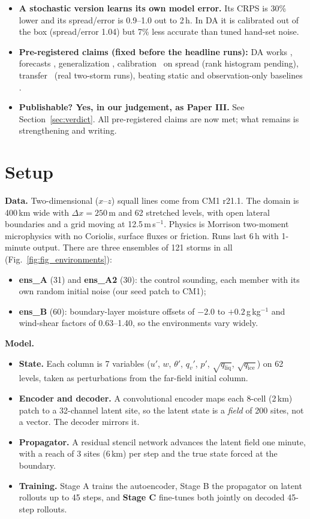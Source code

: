 \documentclass[11pt]{article}
\begin{document}
\begin{tcolorbox}[colback=blue!3,colframe=blue!40!black,title=Headline results (all on storms the model never saw)]
\begin{itemize}
\item \textbf{A stochastic version learns its own model error.} Its CRPS is 30\% lower and its spread/error is 0.9--1.0 out to 2\,h. In DA it is calibrated out of the box (spread/error 1.04) but 7\% less accurate than tuned hand-set noise.
\item \textbf{Pre-registered claims (fixed before the headline runs):} DA works \checkmark, forecasts \checkmark, generalization \checkmark, calibration \checkmark\ on spread (rank histogram pending), transfer \checkmark\ (real two-storm runs), beating static and observation-only baselines \checkmark.
\item \textbf{Publishable? Yes, in our judgement, as Paper III.} See Section~\ref{sec:verdict}. All pre-registered claims are now met; what remains is strengthening and writing.
\end{itemize}
\end{tcolorbox}

\section{Setup}
\textbf{Data.} Two-dimensional ($x$--$z$) squall lines come from CM1 r21.1. The domain is 400\,km wide with $\Delta x=250$\,m and 62 stretched levels, with open lateral boundaries and a grid moving at 12.5\,m\,s$^{-1}$. Physics is Morrison two-moment microphysics with no Coriolis, surface fluxes or friction. Runs last 6\,h with 1-minute output. There are three ensembles of 121 storms in all (Fig.~\ref{fig:fig_environments}):
\begin{itemize}
\item \textbf{ens\_A} (31) and \textbf{ens\_A2} (30): the control sounding, each member with its own random initial noise (our seed patch to CM1);
\item \textbf{ens\_B} (60): boundary-layer moisture offsets of $-2.0$ to $+0.2$\,g\,kg$^{-1}$ and wind-shear factors of 0.63--1.40, so the environments vary widely.
\end{itemize}

\textbf{Model.}
\begin{itemize}
\item \textbf{State.} Each column is 7 variables ($u'$, $w$, $\theta'$, $q_v'$, $p'$, $\sqrt{q_\mathrm{liq}}$, $\sqrt{q_\mathrm{ice}}$) on 62 levels, taken as perturbations from the far-field initial column.
\item \textbf{Encoder and decoder.} A convolutional encoder maps each 8-cell (2\,km) patch to a 32-channel latent site, so the latent state is a \emph{field} of 200 sites, not a vector. The decoder mirrors it.
\item \textbf{Propagator.} A residual stencil network advances the latent field one minute, with a reach of 3 sites (6\,km) per step and the true state forced at the boundary.
\item \textbf{Training.} Stage A trains the autoencoder, Stage B the propagator on latent rollouts up to 45 steps, and \textbf{Stage C} fine-tunes both jointly on decoded 45-step rollouts.
\end{itemize}
\end{document}
